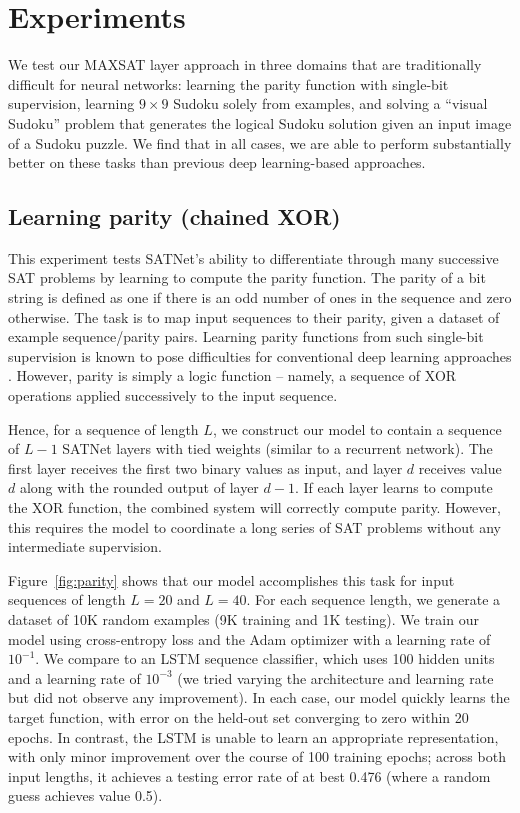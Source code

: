 \documentclass{article}
\begin{document}
	\section{Experiments}
	
	We test our MAXSAT layer approach in three domains that are traditionally difficult for neural networks: learning the parity function with single-bit supervision, learning $9 \times 9$ Sudoku solely from examples, and solving a ``visual Sudoku'' problem that generates the logical Sudoku solution given an input image of a Sudoku puzzle.
	We find that in all cases, we are able to perform substantially better on these tasks than previous deep learning-based approaches.
	
	
	\subsection{Learning parity (chained XOR)}


	This experiment tests SATNet's ability to differentiate through many successive SAT problems by learning to compute the parity function. 
	The parity of a bit string is defined as one if there is an odd number of ones in the sequence and zero otherwise. 
	The task is to map input sequences to their parity, given a dataset of example sequence/parity pairs. Learning parity functions from such single-bit supervision is known to pose difficulties for conventional deep learning approaches \cite{shalev2017failures}. 
	However, parity is simply a logic function -- namely, a sequence of XOR operations applied successively to the input sequence.
	
Hence, for a sequence of length $L$, we construct our model to contain a sequence of $L-1$ SATNet layers with tied weights (similar to a recurrent network). 
	The first layer receives the first two binary values as input, and layer $d$ receives value $d$ along with the rounded output of layer $d-1$. If each layer learns to compute the XOR function, the combined system will correctly compute parity. 
	However, this requires the model to coordinate a long series of SAT problems without any intermediate supervision. 
	
	Figure~\ref{fig:parity}  shows that our model accomplishes this task for input sequences of length $L = 20$ and $L=40$.
	For each sequence length, we generate a dataset of 10K random examples (9K training and 1K testing). 
	We train our model using cross-entropy loss and the Adam optimizer \cite{kingma2015adam} with a learning rate of $10^{-1}$. 
	We compare to an LSTM sequence classifier, which uses 100 hidden units and a learning rate of $10^{-3}$ (we tried varying the architecture and learning rate but did not observe any improvement). 
	In each case, our model quickly learns the target function, with error on the held-out set converging to zero within 20 epochs. 
	In contrast, the LSTM is unable to learn an appropriate representation, with only minor improvement over the course of 100 training epochs; across both input lengths, it achieves a testing error rate of at best 0.476 (where a random guess achieves value 0.5).   
	
\end{document}

